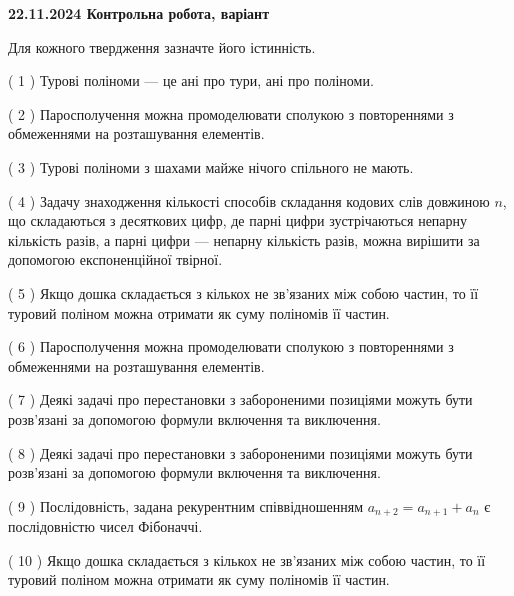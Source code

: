 \documentclass[12pt, ukrainian]{article}
\begin{document}
\vspace{4mm}
\newpage
\begin {large}

\textbf{22.11.2024 Контрольна робота, варіант  }\par


{
Для кожного твердження зазначте його істинність.\par
\vspace{2mm}
( 1 ) Турові поліноми --- це ані про тури, ані про поліноми.%

( 2 ) Паросполучення можна промоделювати сполукою з повтореннями з обмеженнями на розташування елементів.%

( 3 ) Турові поліноми з шахами майже нічого спільного не мають.%

( 4 ) Задачу знаходження кількості способів складання кодових слів довжиною $n$, що складаються з десяткових цифр, де парні цифри зустрічаються непарну кількість разів, а парні цифри — непарну кількість разів, можна вирішити за допомогою експоненційної твірної.%

( 5 ) Якщо дошка складається з кількох не зв’язаних між собою частин, то її туровий поліном можна отримати як суму поліномів її частин.%

( 6 ) Паросполучення можна промоделювати сполукою з повтореннями з обмеженнями на розташування елементів.%

( 7 ) Деякі задачі про перестановки з забороненими позиціями можуть бути розв’я\-за\-ні за допомогою формули включення та виключення.%

( 8 ) Деякі задачі про перестановки з забороненими позиціями можуть бути розв’я\-за\-ні за допомогою формули включення та виключення.%

( 9 ) Послідовність, задана рекурентним співвідношенням $a_{n+2}=a_{n+1}+a_{n}$ є послідовністю чисел Фібоначчі.%

( 10 ) Якщо дошка складається з кількох не зв’язаних між собою частин, то її туровий поліном можна отримати як суму поліномів її частин.%


\vspace{5mm}
}
\end {large}
\end{document}
